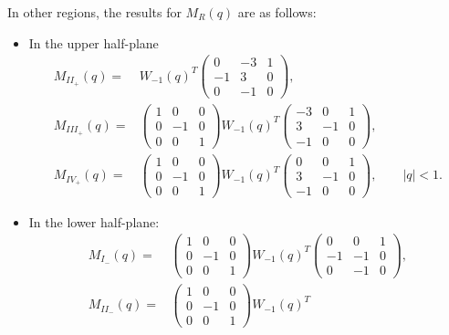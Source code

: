 \documentclass[12pt,reqno]{amsart}
\theoremstyle{definition}
\begin{document}
%
In other regions, the results for $M_R(q)$ are as follows: 
\begin{itemize}
\item In the upper half-plane
  \begin{align}
    M_{II_+}(q) =
    &W_{-1}(q)^T
      \begin{pmatrix}
        0&-3&1\\
        -1&3&0\\
        0&-1&0
      \end{pmatrix},\\
    M_{III_+}(q) = &\begin{pmatrix}
      1&0&0\\
      0&-1&0\\
      0&0&1
    \end{pmatrix}
           W_{-1}(q)^T
  \begin{pmatrix}
    -3&0&1\\
    3&-1&0\\
    -1&0&0
  \end{pmatrix}, \\
      M_{IV_+}(q) =
  &\begin{pmatrix}
      1&0&0\\
      0&-1&0\\
      0&0&1
  \end{pmatrix}
  W_{-1}(q)^T
  \begin{pmatrix}
    0&0&1\\
    3&-1&0\\
    -1&0&0
  \end{pmatrix},\qquad |q|<1.
  \end{align}
\item In the lower half-plane:
 \begin{align}
  M_{I_-}(q) = &\begin{pmatrix}
      1&0&0\\
      0&-1&0\\
      0&0&1
  \end{pmatrix}W_{-1}(q)^T
  \begin{pmatrix}
      0&0&1\\
      -1&-1&0\\
      0&-1&0
  \end{pmatrix}, \\
  M_{II_-}(q) = &\begin{pmatrix}
      1&0&0\\
      0&-1&0\\
      0&0&1
  \end{pmatrix}W_{-1}(q)^T

\end{align}
\end{itemize}
\end{document}
